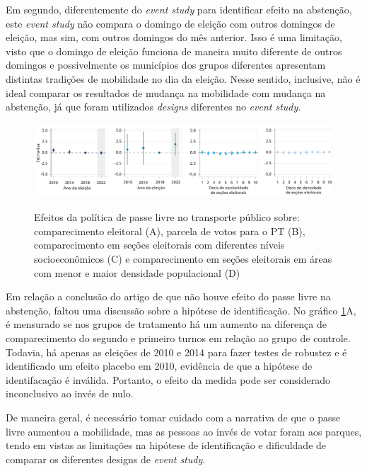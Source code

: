 Em segundo, diferentemente do \textit{event study} para identificar efeito na abstenção, este \textit{event study} não compara o domingo de eleição com outros domingos de eleição, mas sim, com outros domingos do mês anterior. Isso é uma limitação, visto que o domingo de eleição funciona de maneira muito diferente de outros domingos e possivelmente os municípios dos grupos diferentes apresentam distintas tradições de mobilidade no dia da eleição. Nesse sentido, inclusive, não é ideal comparar os resultados de mudança na mobilidade com mudança na abstenção, já que foram utilizados \textit{designs} diferentes no \textit{event study}.

\begin{figure}[!ht]
  \caption{Efeitos da política de passe livre no transporte público sobre: comparecimento eleitoral (A), parcela de votos para o PT (B), comparecimento em seções eleitorais com diferentes níveis socioeconômicos (C) e comparecimento em seções eleitorais em áreas com menor e maior densidade populacional (D)}
    \includegraphics[width = \linewidth]{relatorios/passe-livre/graficos/pereira_abst.png}
    \label{fig_pereira_abst}
\end{figure}

Em relação a conclusão do artigo de que não houve efeito do passe livre na abstenção, faltou uma discussão sobre a hipótese de identificação. No gráfico \ref{fig_pereira_abst}A, é mensurado se nos grupos de tratamento há um aumento na diferença de comparecimento do segundo e primeiro turnos em relação ao grupo de controle. Todavia, há apenas as eleições de 2010 e 2014 para fazer testes de robustez e é identificado um efeito placebo em 2010, evidência de que a hipótese de identifacação é inválida. Portanto, o efeito da medida pode ser considerado inconclusivo ao invés de nulo.

De maneira geral, é necessário tomar cuidado com a narrativa de que o passe livre aumentou a mobilidade, mas as pessoas ao invés de votar foram aos parques, tendo em vistas as limitações na hipótese de identificação e dificuldade de comparar os diferentes designs de \textit{event study}.

